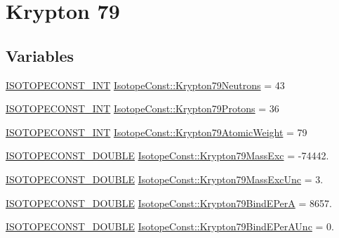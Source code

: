 \hypertarget{group___isotope_const-_krypton-_kr79}{}\section{Krypton 79}
\label{group___isotope_const-_krypton-_kr79}
\subsection*{Variables}
\begin{DoxyCompactItemize}
\item 
\mbox{\hyperlink{group___isotope_const-_macros_ga5f18360b3e99483a35c32d789e62621c}{I\+S\+O\+T\+O\+P\+E\+C\+O\+N\+S\+T\+\_\+\+I\+NT}} \mbox{\hyperlink{group___isotope_const-_krypton-_kr79_gab952b5145dcd130b268a81cf3dbaec74}{Isotope\+Const\+::\+Krypton79\+Neutrons}} = 43
\item 
\mbox{\hyperlink{group___isotope_const-_macros_ga5f18360b3e99483a35c32d789e62621c}{I\+S\+O\+T\+O\+P\+E\+C\+O\+N\+S\+T\+\_\+\+I\+NT}} \mbox{\hyperlink{group___isotope_const-_krypton-_kr79_gab0636b618b6089a0764300c66d8a8718}{Isotope\+Const\+::\+Krypton79\+Protons}} = 36
\item 
\mbox{\hyperlink{group___isotope_const-_macros_ga5f18360b3e99483a35c32d789e62621c}{I\+S\+O\+T\+O\+P\+E\+C\+O\+N\+S\+T\+\_\+\+I\+NT}} \mbox{\hyperlink{group___isotope_const-_krypton-_kr79_gab88821a95db6c33905ff751b82e9f9f1}{Isotope\+Const\+::\+Krypton79\+Atomic\+Weight}} = 79
\item 
\mbox{\hyperlink{group___isotope_const-_macros_ga8f45a7272ce02c0b4c65c44636ed719a}{I\+S\+O\+T\+O\+P\+E\+C\+O\+N\+S\+T\+\_\+\+D\+O\+U\+B\+LE}} \mbox{\hyperlink{group___isotope_const-_krypton-_kr79_ga8872afdff4166a1035aa3e2f166d855c}{Isotope\+Const\+::\+Krypton79\+Mass\+Exc}} = -\/74442.
\item 
\mbox{\hyperlink{group___isotope_const-_macros_ga8f45a7272ce02c0b4c65c44636ed719a}{I\+S\+O\+T\+O\+P\+E\+C\+O\+N\+S\+T\+\_\+\+D\+O\+U\+B\+LE}} \mbox{\hyperlink{group___isotope_const-_krypton-_kr79_gaecfcd9d0de54286fa07a6d96c5f61cd4}{Isotope\+Const\+::\+Krypton79\+Mass\+Exc\+Unc}} = 3.
\item 
\mbox{\hyperlink{group___isotope_const-_macros_ga8f45a7272ce02c0b4c65c44636ed719a}{I\+S\+O\+T\+O\+P\+E\+C\+O\+N\+S\+T\+\_\+\+D\+O\+U\+B\+LE}} \mbox{\hyperlink{group___isotope_const-_krypton-_kr79_ga3200b91d6357e9d03cdecb37ec072bb1}{Isotope\+Const\+::\+Krypton79\+Bind\+E\+PerA}} = 8657.
\item 
\mbox{\hyperlink{group___isotope_const-_macros_ga8f45a7272ce02c0b4c65c44636ed719a}{I\+S\+O\+T\+O\+P\+E\+C\+O\+N\+S\+T\+\_\+\+D\+O\+U\+B\+LE}} \mbox{\hyperlink{group___isotope_const-_krypton-_kr79_gaea1c711aed1fe314a95b2fa5382827c5}{Isotope\+Const\+::\+Krypton79\+Bind\+E\+Per\+A\+Unc}} = 0.

\end{DoxyCompactItemize}
